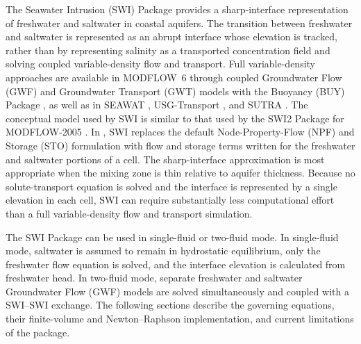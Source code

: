 %

The Seawater Intrusion (SWI) Package provides a sharp-interface representation of freshwater and saltwater in coastal aquifers. The transition between freshwater and saltwater is represented as an abrupt interface whose elevation is tracked, rather than by representing salinity as a transported concentration field and solving coupled variable-density flow and transport. Full variable-density approaches are available in MODFLOW~6 through coupled Groundwater Flow (GWF) and Groundwater Transport (GWT) models with the Buoyancy (BUY) Package \citep{langevin2020hydraulic,modflow6gwt}, as well as in SEAWAT \citep{langevin2008seawat}, USG-Transport \citep{panday2019bct}, and SUTRA \citep{vosssutra}. The conceptual model used by SWI is similar to that used by the SWI2 Package for MODFLOW-2005 \citep{bakker2013documentation}. In \mf, SWI replaces the default Node-Property-Flow (NPF) and Storage (STO) formulation with flow and storage terms written for the freshwater and saltwater portions of a cell. The sharp-interface approximation is most appropriate when the mixing zone is thin relative to aquifer thickness. Because no solute-transport equation is solved and the interface is represented by a single elevation in each cell, SWI can require substantially less computational effort than a full variable-density flow and transport simulation.

The SWI Package can be used in single-fluid or two-fluid mode. In single-fluid mode, saltwater is assumed to remain in hydrostatic equilibrium, only the freshwater flow equation is solved, and the interface elevation is calculated from freshwater head. In two-fluid mode, separate freshwater and saltwater Groundwater Flow (GWF) models are solved simultaneously and coupled with a SWI--SWI exchange. The following sections describe the governing equations, their finite-volume and Newton--Raphson implementation, and current limitations of the package.

